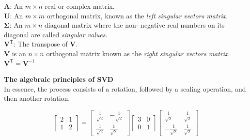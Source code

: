\documentclass[a1paper,portrait,margin=0.8cm]{baposter}
\begin{document}
\begin{poster}
{\begin{minipage}[b]{0.5\textwidth}
$\mathbf{A}$: An $m \times n$ real or complex matrix. \\
$\mathbf{U}$: An $m \times m$ orthogonal matrix, known as the \emph{left singular vectors matrix}. \\
$\boldsymbol{\Sigma}$: An $m \times n$ diagonal matrix where the non- negative real numbers on its diagonal are called \emph{singular values}. \\
$\mathbf{V}^\text{T}$: The transpose of $\mathbf{V}$. \\ 
$\mathbf{V}$ is an $n \times n$ orthogonal matrix  known as the \emph{right singular vectors matrix}.\\ 
$\mathbf{V}^\text{T} = \mathbf{V}^{-1}$ \\

\vspace{-1em}

\end{minipage}
\hfill
\begin{minipage}[b]{0.48\textwidth}



\noindent \textbf{The algebraic principles of SVD} \\
In essence, the process consists of a rotation, followed by a scaling operation, and then another rotation.

\vspace{-3em}
\setlength{\arraycolsep}{1.5pt}


\[
\!\begin{bmatrix} 2 & 1 \\ 1 & 2 \end{bmatrix} 
\!\!=\!\!
\begin{bmatrix} 
\frac{1}{\sqrt{2}} & -\frac{1}{\sqrt{2}} \\[5pt]
\frac{1}{\sqrt{2}} & \frac{1}{\sqrt{2}} 
\end{bmatrix}\!\!
\begin{bmatrix} 3 & 0 \\ 0 & 1 \end{bmatrix}\!\!
\begin{bmatrix}
\frac{1}{\sqrt{2}} & \frac{1}{\sqrt{2}} \\[5pt]
-\frac{1}{\sqrt{2}} & \frac{1}{\sqrt{2}} 
\end{bmatrix}
\]


\end{minipage}}
\end{poster}
\end{document}
